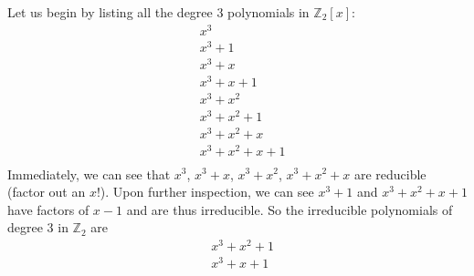 \documentclass{article}
\begin{document}
Let us begin by listing all the degree 3 polynomials in $\mathbb{Z}_2[x]$:
\begin{align*}
    &x^3 \\
    &x^3 + 1 \\
    &x^3 + x \\
    &x^3 + x + 1 \\
    &x^3 + x^2 \\
    &x^3 + x^2 + 1 \\
    &x^3 + x^2 + x \\
    &x^3 + x^2 + x + 1\\
\end{align*}
Immediately, we can see that $x^3$, $x^3 + x$, $x^3 + x^2$, $x^3 + x^2 + x$ are reducible (factor out an $x$!). Upon further inspection, we can see $x^3 + 1$ and $x^3 + x^2 + x + 1$ have factors of $x - 1$ and are thus irreducible. So the irreducible polynomials of degree 3 in $\mathbb{Z}_2$ are 
\begin{align*}
    &x^3 + x^2 + 1 \\
    &x^3 + x + 1 \\
\end{align*}
\end{document}
